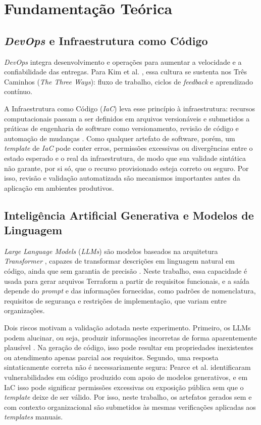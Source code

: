 \section{Fundamentação Teórica}
\label{sec:fundamentacao}

\subsection{\textit{DevOps} e Infraestrutura como Código}

\textit{DevOps} integra desenvolvimento e operações para aumentar a velocidade e a confiabilidade das entregas. Para Kim et al. \cite{kim2016devops}, essa cultura se sustenta nos Três Caminhos (\textit{The Three Ways}): fluxo de trabalho, ciclos de \textit{feedback} e aprendizado contínuo.

A Infraestrutura como Código (\textit{IaC}) leva esse princípio à infraestrutura: recursos computacionais passam a ser definidos em arquivos versionáveis e submetidos a práticas de engenharia de software como versionamento, revisão de código e automação de mudanças \cite{morris2016infrastructure}. Como qualquer artefato de software, porém, um \textit{template} de \textit{IaC} pode conter erros, permissões excessivas ou divergências entre o estado esperado e o real da infraestrutura, de modo que sua validade sintática não garante, por si só, que o recurso provisionado esteja correto ou seguro. Por isso, revisão e validação automatizada são mecanismos importantes antes da aplicação em ambientes produtivos.

\subsection{Inteligência Artificial Generativa e Modelos de Linguagem}

\textit{Large Language Models} (\textit{LLMs}) são modelos baseados na arquitetura \textit{Transformer} \cite{vaswani2017attention}, capazes de transformar descrições em linguagem natural em código, ainda que sem garantia de precisão \cite{chen2021codex}. Neste trabalho, essa capacidade é usada para gerar arquivos Terraform a partir de requisitos funcionais, e a saída depende do \textit{prompt} e das informações fornecidas, como padrões de nomenclatura, requisitos de segurança e restrições de implementação, que variam entre organizações.

Dois riscos motivam a validação adotada neste experimento. Primeiro, os LLMs podem alucinar, ou seja, produzir informações incorretas de forma aparentemente plausível \cite{ji2023hallucination}. Na geração de código, isso pode resultar em propriedades inexistentes ou atendimento apenas parcial aos requisitos. Segundo, uma resposta sintaticamente correta não é necessariamente segura: Pearce et al. \cite{pearce2022copilot} identificaram vulnerabilidades em código produzido com apoio de modelos generativos, e em IaC isso pode significar permissões excessivas ou exposição pública sem que o \textit{template} deixe de ser válido. Por isso, neste trabalho, os artefatos gerados sem e com contexto organizacional são submetidos às mesmas verificações aplicadas aos \textit{templates} manuais.

